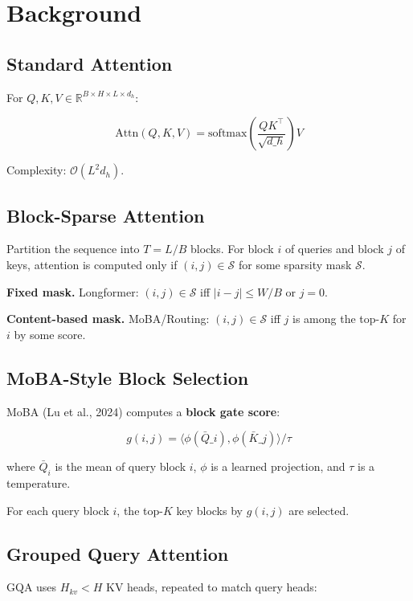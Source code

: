 \section{Background}

\subsection{Standard Attention}

For $Q, K, V \in \mathbb{R}^{B \times H \times L \times d_h}$:

\[
\text{Attn}(Q, K, V) = \text{softmax}\!\left(\frac{Q K^\top}{\sqrt{d\_h}}\right) V
\tag{3.1}
\]

Complexity: $\mathcal{O}(L^2 d_h)$.

\subsection{Block-Sparse Attention}

Partition the sequence into $T = L / B$ blocks. For block $i$ of queries 
and block $j$ of keys, attention is computed only if $(i, j) \in \mathcal{S}$ 
for some sparsity mask $\mathcal{S}$.

\textbf{Fixed mask.} Longformer: $(i, j) \in \mathcal{S}$ iff $|i - j| \leq W/B$ 
or $j = 0$.

\textbf{Content-based mask.} MoBA/Routing: $(i, j) \in \mathcal{S}$ iff $j$ 
is among the top-$K$ for $i$ by some score.

\subsection{MoBA-Style Block Selection}

MoBA (Lu et al., 2024) computes a \textbf{block gate score}:

\[
g(i, j) = \langle \phi(\bar{Q}\_i), \phi(\bar{K}\_j) \rangle / \tau
\tag{3.2}
\]

where $\bar{Q}_i$ is the mean of query block $i$, $\phi$ is a learned 
projection, and $\tau$ is a temperature.

For each query block $i$, the top-$K$ key blocks by $g(i, j)$ are selected.

\subsection{Grouped Query Attention}

GQA uses $H_{kv} < H$ KV heads, repeated to match query heads:

